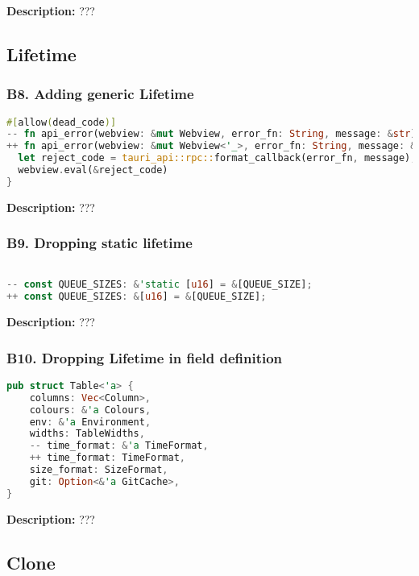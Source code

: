 \noindent \textbf{Description:} ???

\subsection{Lifetime}
\subsubsection{B8. Adding generic Lifetime}
\begin{lstlisting}[language=Rust, style=colouredRust, label={l3}]
#[allow(dead_code)]
-- fn api_error(webview: &mut Webview, error_fn: String, message: &str) {
++ fn api_error(webview: &mut Webview<'_>, error_fn: String, message: &str) {
  let reject_code = tauri_api::rpc::format_callback(error_fn, message);
  webview.eval(&reject_code)
}

\end{lstlisting}

\noindent \textbf{Description:} ???

\subsubsection{B9. Dropping static lifetime}

\begin{lstlisting}[language=Rust, style=colouredRust, label={l3}]

-- const QUEUE_SIZES: &'static [u16] = &[QUEUE_SIZE];
++ const QUEUE_SIZES: &[u16] = &[QUEUE_SIZE];

\end{lstlisting}

\noindent \textbf{Description:} ???

\subsubsection{B10. Dropping Lifetime in field definition}

\begin{lstlisting}[language=Rust, style=colouredRust, label={l3}]
pub struct Table<'a> {
    columns: Vec<Column>,
    colours: &'a Colours,
    env: &'a Environment,
    widths: TableWidths,
    -- time_format: &'a TimeFormat,
    ++ time_format: TimeFormat,
    size_format: SizeFormat,
    git: Option<&'a GitCache>,
}
\end{lstlisting}

\noindent \textbf{Description:} ???

\subsection{Clone}
